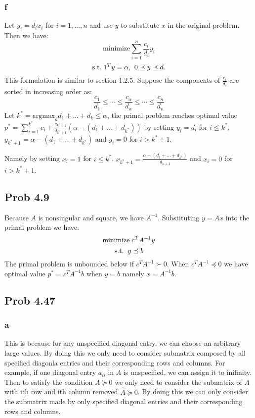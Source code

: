 \message{ !name(ass3_ChangLi.tex)}\documentclass[10pt,a4paper]{article}
\begin{document}
\subsubsection{f}
Let $y_i=d_ix_i$ for $i=1,\dots,n$ and use $y$ to substitute
$x$ in the original problem. Then we have:
$$
\text{minimize} \sum_{i=1}^n \frac{c_i}{d_i}y_i
$$
$$
\text{s.t.\;} 1^Ty=\alpha\text{,\;\;} 0\preceq y \preceq d.
$$
This formulation is similar to section 1.2.5. Suppose the
components of $\frac{c_i}{d_i}$ are sorted in increasing
order as:
$$
\frac{c_1}{d_1}\leq \dotsb \leq \frac{c_\alpha}{d_\alpha} \leq \dotsb \leq\frac{c_n}{d_n} 
$$
Let $k^*=\text{argmax}_kd_1+\dots+d_k\leq \alpha$, the primal problem reaches
optimal value
$p^*=\sum_{i=1}^{k^*}c_i+\frac{c_{k^*+1}}{d_{k^*+1}}(\alpha-(d_1+\dots+d_{k^*}))$
by setting $y_i=d_i$ for $i\leq k^*$, $y_{k^*+1}=\alpha-(d_1+\dots+d_{k^*})$ and
$y_i=0$ for $i>k^*+1$.

Namely by setting $x_i=1$ for $i\leq k^*$, $x_{k^*+1}=\frac{\alpha-(d_1+\dots+d_{k^*})}{d_{k+1}}$ and
$x_i=0$ for $i>k^*+1$.


\subsection{Prob 4.9}
Because $A$ is nonsingular and square, we have $A^{-1}$. Substituting
$y=Ax$ into the primal problem we have:
$$
\text{minimize\;} c^TA^{-1}y
$$
$$
\text{s.t.\;\;} y\preceq b
$$
The primal problem is unbounded below if $c^TA^{-1}\succ0$.
When $c^TA^{-1}\preceq 0$ we have optimal value
$p^*=c^TA^{-1}b$ when $y=b$ namely $x=A^{-1}b$.

\subsection{Prob 4.47}

\subsubsection{a}
This is because for any unspecified diagonal entry, we can
choose an arbitrary large values. By doing this we only need
to consider submatrix composed by all specified diagonla
entries and their corresponding rows and columns. For
example, if one diagonal entry $a_{ii}$ in $A$ is
unspecified, we can assign it to inifinity. Then to satisfy
the condition $A\succeq0$ we only need to consider the
submatrix of $A$ with ith row and ith column removed
$\hat{A}\succeq0$. By doing this we can only consider the
submatrix made by only specified diagonal entries and their
corresponding rows and columns. 
\end{document}
